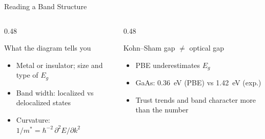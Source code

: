 \documentclass[8pt]{beamer}
\begin{document}
\begin{frame}{Reading a Band Structure}
\begin{columns}[T]
\begin{column}{0.48\textwidth}
\begin{block}{What the diagram tells you}
				\small
				\begin{itemize}
					\item Metal or insulator; size and type of $E_g$
					\item Band width: localized vs delocalized states
					\item Curvature: $1/m^* = \hbar^{-2}\,\partial^2 E/\partial k^2$
				\end{itemize}
			\end{block}
		\end{column}
		\begin{column}{0.48\textwidth}
			\begin{alertblock}{Kohn--Sham gap $\neq$ optical gap}
				\small
				\begin{itemize}
					\item PBE underestimates $E_g$
					\item GaAs: 0.36~eV (PBE) vs 1.42~eV (exp.)
					\item Trust trends and band character more than the number
				\end{itemize}
			\end{alertblock}
		\end{column}
	\end{columns}
\end{frame}
\end{document}

